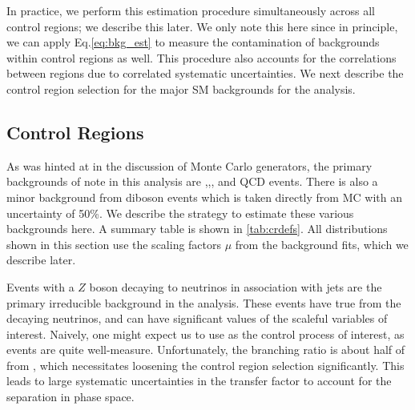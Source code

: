 In practice, we perform this estimation procedure simultaneously across all control regions; we describe this later.
We only note this here since in principle, we can apply Eq.\ref{eq:bkg_est} to measure the contamination of backgrounds within control regions as well.
This procedure also accounts for the correlations between regions due to correlated systematic uncertainties.
We next describe the control region selection for the major SM backgrounds for the analysis.

\subsection{Control Regions}

As was hinted at in the discussion of Monte Carlo generators, the primary backgrounds of note in this analysis are \zjets,\wjets,\ttbar, and QCD events.
There is also a minor background from diboson events which is taken directly from MC with an uncertainty of 50\%.
We describe the strategy to estimate these various backgrounds here.
A summary table is shown in \ref{tab:crdefs}.
All distributions shown in this section use the scaling factors $\mu$ from the background fits, which we describe later.


Events with a $Z$ boson decaying to neutrinos in association with jets are the primary irreducible background in the analysis.
These events have true \met from the decaying neutrinos, and can have significant values of the scaleful variables of interest.
Naively, one might expect us to use \Zll as the control process of interest, as \Zll events are quite well-measure.
Unfortunately, the \Zll branching ratio is about half of from \Zvv, which necessitates loosening the control region selection significantly.
This leads to large systematic uncertainties in the transfer factor to account for the separation in phase space.

